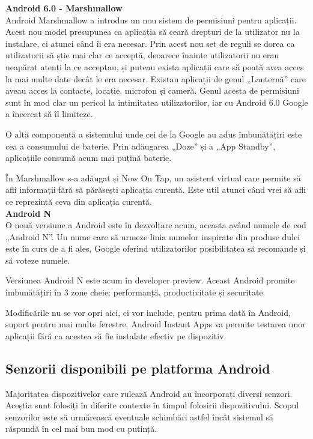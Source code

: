 \documentclass[12pt,a4paper]{article}
\begin{document}
\textbf{Android 6.0 - Marshmallow}\\
Android Marshmallow a introdus un nou sistem de permisiuni pentru aplicații. Acest nou model presupunea ca aplicația să ceară drepturi de la utilizator nu la instalare, ci atunci când îi era necesar. Prin acest nou set de reguli se dorea ca utilizatorii să știe mai clar ce acceptă, deoarece înainte utilizatorii nu erau neapărat atenți la ce acceptau, și puteau exista aplicații care să poată avea acces la mai multe date decât le era necesar. Existau aplicații de genul „Lanternă” care aveau acces la contacte, locație, microfon și cameră. Genul acesta de permisiuni sunt în mod clar un pericol la intimitatea utilizatorilor, iar cu Android 6.0 Google a încercat să îl limiteze.

	O altă componentă a sistemului unde cei de la Google au adus îmbunătățiri este cea a consumului de baterie. Prin adăugarea „Doze” și a „App Standby”, aplicațiile consumă acum mai puțină baterie.

	În Marshmallow s-a adăugat și Now On Tap, un asistent virtual care permite să afli informații fără să părăsești aplicația curentă. Este util atunci când vrei să afli ce reprezintă ceva din aplicația curentă.\\

\textbf{Android N}\\
O nouă versiune a Android este în dezvoltare acum, aceasta având numele de cod „Android N”. Un nume care să urmeze linia numelor inspirate din produse dulci este în curs de a fi ales, Google oferind utilizatorilor posibilitatea să recomande și să voteze numele.
	
	Versiunea Android N este acum în developer preview. Aceast Android promite îmbunătățiri în 3 zone cheie: performanță, productivitate și securitate.
	
	Modificările nu se vor opri aici, ci vor include, pentru prima dată în Android, suport pentru mai multe ferestre. Android Instant Apps va permite testarea unor aplicații fără ca acestea să fie instalate efectiv pe dispozitiv.\\
	

\newpage
\subsection{Senzorii disponibili pe platforma Android}
Majoritatea dispozitivelor care rulează Android au încorporați diverși senzori. Aceștia sunt folosiți în diferite contexte în timpul folosirii dispozitivului. Scopul senzorilor este să urmărească eventuale schimbări astfel încât sistemul să răspundă în cel mai bun mod cu putință.
\end{document}
